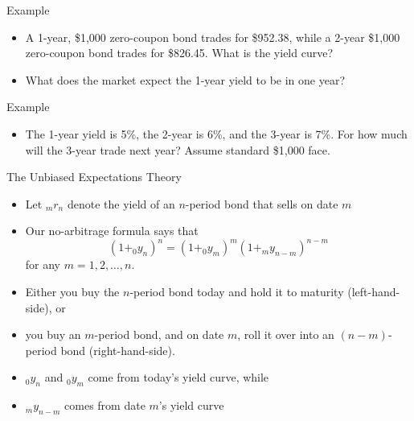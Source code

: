 \documentclass{beamer}
\begin{document}
\begin{frame}{Example}
    \begin{itemize}
        \item A 1-year, \$1,000 zero-coupon bond trades for \$952.38, while a 2-year \$1,000 zero-coupon bond trades for \$826.45. What is the yield curve?
        \item What does the market expect the 1-year yield to be in one year?
    \end{itemize}
\end{frame}

\begin{frame}{Example}
    \begin{itemize}
        \item The 1-year yield is 5\%, the 2-year is 6\%, and the 3-year is 7\%. For how much will the 3-year trade next year? Assume standard \$1,000 face. 
    \end{itemize}
\end{frame}

\begin{frame}{The Unbiased Expectations Theory}
\begin{itemize}
    \item Let $_{m}r_{n}$ denote the yield of an $n$-period bond that sells on date $m$
    \item Our no-arbitrage formula says that  
        \begin{equation}\label{eq:ourformula}
        (1+_{0}y_{n})^{n}=(1+_{0}y_{m})^{m}(1+_{m}y_{n-m})^{n-m}
        \end{equation}
        for any $m=1,2,\ldots,n$. 
    \item Either you buy the $n$-period bond today and hold it to maturity (left-hand-side), or 
    \item you buy an $m$-period bond, and on date $m$, roll it over into an  $(n-m)$-period bond (right-hand-side). 
    \item $_{0}y_{n}$ and $_{0}y_{m}$ come from today's yield curve, while
    \item $_{m}y_{n-m}$ comes from date $m$'s yield curve
\end{itemize}
\end{frame}
\end{document}
